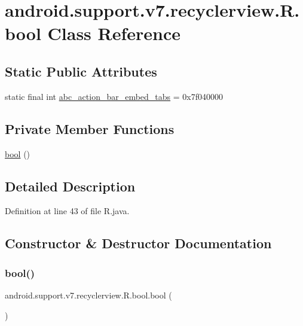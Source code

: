 \hypertarget{classandroid_1_1support_1_1v7_1_1recyclerview_1_1_r_1_1bool}{}\section{android.\+support.\+v7.\+recyclerview.\+R.\+bool Class Reference}
\label{classandroid_1_1support_1_1v7_1_1recyclerview_1_1_r_1_1bool}
\subsection*{Static Public Attributes}
\begin{DoxyCompactItemize}
\item 
static final int \mbox{\hyperlink{classandroid_1_1support_1_1v7_1_1recyclerview_1_1_r_1_1bool_a09daaf77c51bf57b0e10b5634f08e2c6}{abc\+\_\+action\+\_\+bar\+\_\+embed\+\_\+tabs}} = 0x7f040000
\end{DoxyCompactItemize}
\subsection*{Private Member Functions}
\begin{DoxyCompactItemize}
\item 
\mbox{\hyperlink{classandroid_1_1support_1_1v7_1_1recyclerview_1_1_r_1_1bool_addbc64b5fbdc89667059329ade50c81f}{bool}} ()
\end{DoxyCompactItemize}


\subsection{Detailed Description}


Definition at line 43 of file R.\+java.



\subsection{Constructor \& Destructor Documentation}
\mbox{\label{classandroid_1_1support_1_1v7_1_1recyclerview_1_1_r_1_1bool_addbc64b5fbdc89667059329ade50c81f}} 
\subsubsection{\texorpdfstring{bool()}{bool()}}
{\footnotesize\ttfamily android.\+support.\+v7.\+recyclerview.\+R.\+bool.\+bool (\begin{DoxyParamCaption}{ }\end{DoxyParamCaption})\hspace{0.3cm}{\ttfamily [private]}}




